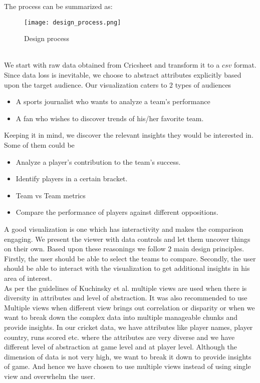 \documentclass[10pt,journal,compsoc]{IEEEtran}
\begin{document}
\noindent The process can be summarized as:
\begin{figure}[ht]
\texttt{[image: design\_process.png]}
\caption{Design process}
\end{figure}\\
\indent We start with raw data obtained from Cricsheet\cite{cricsheet} and transform it to a $csv$ format. Since data loss is inevitable, we choose to abstract attributes explicitly based upon the target audience. Our visualization caters to $2$ types of audiences
\begin{itemize}
\item A sports journalist who wants to analyze a team’s performance
\item A fan who wishes to discover trends of his/her favorite team.
\end{itemize}
Keeping it in mind, we discover the relevant insights they would be interested in. Some of them could be
\begin{itemize}
\item Analyze a player’s contribution to the team’s success.
\item Identify players in a certain bracket.
\item Team vs Team metrics
\item Compare the performance of players against different oppositions.
\end{itemize} 
\indent A good visualization is one which has interactivity and makes the comparison engaging. We present the viewer with data controls and let them uncover things on their own. Based upon these reasonings we follow $2$ main design principles. Firstly, the user should be able to select the teams to compare. Secondly, the user should be able to interact with the visualization to get additional insights in his area of interest.\\

\indent As per the guidelines of Kuchinsky et al. \cite{multipleviews} multiple views are used when there is diversity in attributes and level of abstraction. It was also recommended to use Multiple views when different view brings out correlation or disparity or when we want to break down the complex data into multiple manageable chunks and provide insights. In our cricket data, we have attributes like player names, player country, runs scored etc. where the attributes are very diverse and we have different level of abstraction at game level and at player level. Although the dimension of data is not very high, we want to break it down to provide insights of game. And hence we have chosen to use multiple views instead of using single view and overwhelm the user.\\
\end{document}
